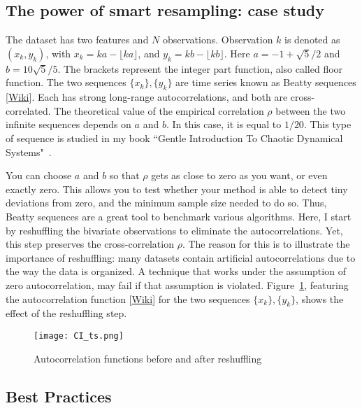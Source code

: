 \documentclass[oneside,10pt]{book}
\begin{document}
\subsection{The power of smart resampling: case study}\label{resa3oblo}

The dataset has two features and $N$ observations. Observation $k$ is denoted as
 $(x_k, y_k)$, with $x_k = ka - \lfloor ka\rfloor$, and $y_k = kb - \lfloor kb \rfloor$. Here $a =-1 +\sqrt{5}/2$  and $b = 10\sqrt{5}/5$.
 The brackets represent the integer part function, also called floor function. The two sequences $\{x_k\}, \{y_k\}$ are
 time series known as \textcolor{index}{Beatty sequences} [\href{https://en.wikipedia.org/wiki/Beatty_sequence}{Wiki}].
Each has strong long-range autocorrelations, and both are cross-correlated. The theoretical value of the empirical correlation $\rho$ between the two infinite sequences depends on $a$ and $b$. In this case, it is equal to $1/20$. This type of sequence is studied in my book
 ``Gentle Introduction To Chaotic Dynamical Systems"~\cite{vgchaos}.

You can choose $a$ and $b$ so that $\rho$ gets as close to zero as you want, or even exactly zero. This allows you to test
  whether your method is able to detect tiny deviations from zero, and the minimum sample size needed to do so. Thus, Beatty sequences are a great tool to benchmark various algorithms. Here, I start by reshuffling the bivariate observations to eliminate
 the autocorrelations. Yet, this step preserves the cross-correlation $\rho$. The reason for this is to illustrate the importance of reshuffling: many datasets contain artificial autocorrelations due to the way the data is organized. A technique that works
 under the assumption of zero autocorrelation, may fail if that assumption is violated. Figure~\ref{fig:not6resd8},
 featuring the \textcolor{index}{autocorrelation function} [\href{https://en.wikipedia.org/wiki/Autocorrelation}{Wiki}] for the two sequences $\{x_k\}, \{y_k\}$,
 shows the effect of the reshuffling step.

\begin{figure}[H]
\centering
\texttt{[image: CI\_ts.png]} %
\caption{Autocorrelation functions before and after reshuffling}
\label{fig:not6resd8}
\end{figure}

\subsection{Best Practices}
\end{document}
